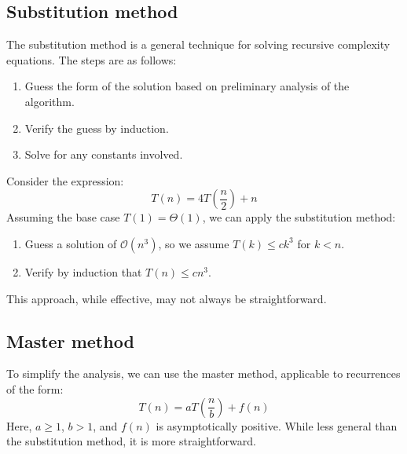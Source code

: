 \subsection{Substitution method}
The substitution method is a general technique for solving recursive complexity equations. 
The steps are as follows:
\begin{enumerate}
    \item Guess the form of the solution based on preliminary analysis of the algorithm.
    \item Verify the guess by induction.
    \item Solve for any constants involved.
\end{enumerate}
\begin{example}
    Consider the expression:
    \[T(n)=4T\left(\frac{n}{2}\right)+n\]
    Assuming the base case $T(1)=\Theta(1)$, we can apply the substitution method:
    \begin{enumerate}
        \item Guess a solution of $\mathcal{O}(n^3)$, so we assume $T(k)\leq c k^3$ for $k<n$. 
        \item Verify by induction that $T(n)\leq c n^3$. 
    \end{enumerate}
\end{example}
This approach, while effective, may not always be straightforward.

\subsection{Master method}
To simplify the analysis, we can use the master method, applicable to recurrences of the form:
\[T(n)=aT\left(\frac{n}{b}\right)+f(n)\]
Here, $a\geq 1$, $b>1$, and $f(n)$ is asymptotically positive. 
While less general than the substitution method, it is more straightforward.

